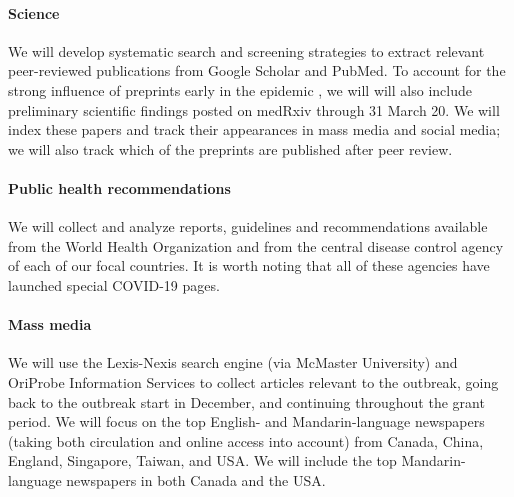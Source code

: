 



\paragraph{Science} We will develop systematic search and screening strategies to extract relevant peer-reviewed publications from Google Scholar and PubMed. To account for the strong influence of preprints early in the epidemic \cite{MajuMandPRE}, we will will also include preliminary scientific findings posted on medRxiv through 31 March 20. We will index these papers and track their appearances in mass media and social media; we will also track which of the preprints are published after peer review.

\paragraph{Public health recommendations} We will collect and analyze reports, guidelines and recommendations available from the World Health Organization and from the central disease control agency of each of our focal countries. It is worth noting that all of these agencies have launched special COVID-19 pages.

\paragraph{Mass media}

We will use the Lexis-Nexis search engine (via McMaster University) and OriProbe Information Services to collect articles relevant to the outbreak, going back to the outbreak start in December, and continuing throughout the grant period. 
We will focus on the top English- and Mandarin-language newspapers (taking both circulation and online access into account) from 
Canada, China, England, Singapore, Taiwan, and USA.
We will include the top Mandarin-language newspapers in both Canada and the USA.

